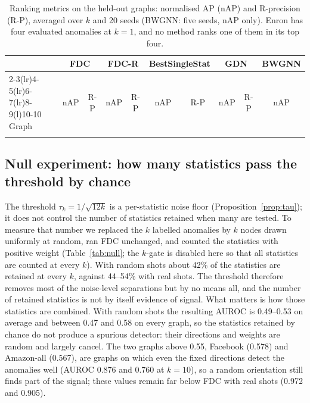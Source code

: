 \documentclass[pdflatex,sn-mathphys-ay]{sn-jnl}
\theoremstyle{plain}
\theoremstyle{remark}
\begin{document}
\begin{table}[!ht]
\caption{Ranking metrics on the held-out graphs: normalised AP (nAP) and R-precision (R-P), averaged over $k$ and 20 seeds (BWGNN: five seeds, nAP only). Enron has four evaluated anomalies at $k=1$, and no method ranks one of them in its top four.}
\label{tab:heldoutmetrics}
\footnotesize
\setlength{\tabcolsep}{3pt}
\begin{tabular*}{\textwidth}{@{\extracolsep{\fill}}lccccccccc@{}}
\toprule
 & \multicolumn{2}{c}{FDC} & \multicolumn{2}{c}{FDC-R} & \multicolumn{2}{c}{BestSingleStat} & \multicolumn{2}{c}{GDN} & BWGNN \\
\cmidrule(lr){2-3}\cmidrule(lr){4-5}\cmidrule(lr){6-7}\cmidrule(lr){8-9}\cmidrule(l){10-10}
Graph & nAP & R-P & nAP & R-P & nAP & R-P & nAP & R-P & nAP \\
\midrule

\botrule
\end{tabular*}
\end{table}

\subsection{Null experiment: how many statistics pass the threshold by chance}\label{sec:null}

The threshold $\tau_k=1/\sqrt{12k}$ is a per-statistic noise floor (Proposition~\ref{prop:tau}); it does not control the number of statistics retained when many are tested. To measure that number we replaced the $k$ labelled anomalies by $k$ nodes drawn uniformly at random, ran FDC unchanged, and counted the statistics with positive weight (Table~\ref{tab:null}; the $k$-gate is disabled here so that all statistics are counted at every $k$). With random shots about 42\% of the statistics are retained at every $k$, against 44--54\% with real shots. The threshold therefore removes most of the noise-level separations but by no means all, and the number of retained statistics is not by itself evidence of signal. What matters is how those statistics are combined. With random shots the resulting AUROC is 0.49--0.53 on average and between 0.47 and 0.58 on every graph, so the statistics retained by chance do not produce a spurious detector: their directions and weights are random and largely cancel. The two graphs above 0.55, Facebook (0.578) and Amazon-all (0.567), are graphs on which even the fixed directions detect the anomalies well (AUROC 0.876 and 0.760 at $k=10$), so a random orientation still finds part of the signal; these values remain far below FDC with real shots (0.972 and 0.905).
\end{document}
